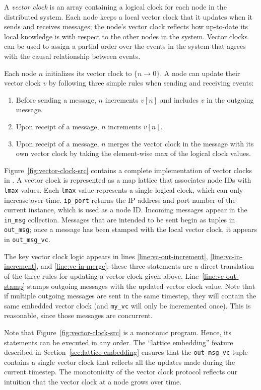 A \emph{vector clock} is an array containing a logical clock for each node in
the distributed system. Each node keeps a local vector clock that it updates
when it sends and receives messages; the node's vector clock reflects how
up-to-date its local knowledge is with respect to the other nodes in the
system. Vector clocks can be used to assign a partial order over the events in
the system that agrees with the causal relationship between events.

Each node $n$ initializes its vector clock to $\{n \rightarrow 0\}$. A node can
update their vector clock $v$ by following three simple rules when sending and
receiving events:
\begin{enumerate}
\item
  Before sending a message, $n$ increments $v[n]$ and includes $v$ in the
  outgoing message.
\item
  Upon receipt of a message, $n$ increments $v[n]$.
\item
  Upon receipt of a message, $n$ merges the vector clock in the message with its
  own vector clock by taking the element-wise max of the logical clock values.
\end{enumerate}

Figure~\ref{fig:vector-clock-src} contains a complete implementation of vector
clocks in \lang. A vector clock is represented as a map lattice that associates
node IDs with \texttt{lmax} values. Each \texttt{lmax} value represents a single
logical clock, which can only increase over time. \texttt{ip\_port} returns the
IP address and port number of the current \lang instance, which is used as a
node ID. Incoming messages appear in the \texttt{in\_msg} collection. Messages
that are intended to be sent begin as tuples in \texttt{out\_msg}; once a
message has been stamped with the local vector clock, it appears in
\texttt{out\_msg\_vc}.

The key vector clock logic appears in lines \ref{line:vc-out-increment},
\ref{line:vc-in-increment}, and \ref{line:vc-in-merge}: these three statements
are a direct translation of the three rules for updating a vector clock given
above. Line~\ref{line:vc-out-stamp} stamps outgoing messages with the updated
vector clock value.  Note that if multiple outgoing messages are sent in the
same \lang timestep, they will contain the same embedded vector clock (and
\texttt{my\_vc} will only be incremented once). This is reasonable, since those
messages are concurrent.

Note that Figure~\ref{fig:vector-clock-src} is a monotonic program. Hence, its
statements can be executed in any order. The ``lattice embedding'' feature
described in Section~\ref{sec:lattice-embedding} ensures that the
\texttt{out\_msg\_vc} tuple contains a single vector clock that reflects all the
updates made during the current timestep. The monotonicity of the vector clock
protocol reflects our intuition that the vector clock at a node grows over
time.%

